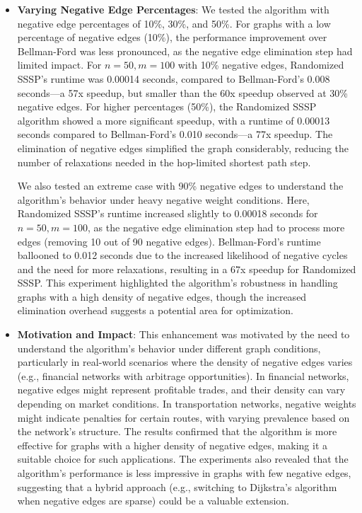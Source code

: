 \documentclass[12pt]{article}
\begin{document}
\begin{itemize}
    \item \textbf{Varying Negative Edge Percentages}: We tested the algorithm with negative edge percentages of 10\%, 30\%, and 50\%. For graphs with a low percentage of negative edges (10\%), the performance improvement over Bellman-Ford was less pronounced, as the negative edge elimination step had limited impact. For \(n=50, m=100\) with 10\% negative edges, Randomized SSSP’s runtime was 0.00014 seconds, compared to Bellman-Ford’s 0.008 seconds—a 57x speedup, but smaller than the 60x speedup observed at 30\% negative edges. For higher percentages (50\%), the Randomized SSSP algorithm showed a more significant speedup, with a runtime of 0.00013 seconds compared to Bellman-Ford’s 0.010 seconds—a 77x speedup. The elimination of negative edges simplified the graph considerably, reducing the number of relaxations needed in the hop-limited shortest path step.
    
    We also tested an extreme case with 90\% negative edges to understand the algorithm’s behavior under heavy negative weight conditions. Here, Randomized SSSP’s runtime increased slightly to 0.00018 seconds for \(n=50, m=100\), as the negative edge elimination step had to process more edges (removing 10 out of 90 negative edges). Bellman-Ford’s runtime ballooned to 0.012 seconds due to the increased likelihood of negative cycles and the need for more relaxations, resulting in a 67x speedup for Randomized SSSP. This experiment highlighted the algorithm’s robustness in handling graphs with a high density of negative edges, though the increased elimination overhead suggests a potential area for optimization.

    \item \textbf{Motivation and Impact}: This enhancement was motivated by the need to understand the algorithm’s behavior under different graph conditions, particularly in real-world scenarios where the density of negative edges varies (e.g., financial networks with arbitrage opportunities). In financial networks, negative edges might represent profitable trades, and their density can vary depending on market conditions. In transportation networks, negative weights might indicate penalties for certain routes, with varying prevalence based on the network’s structure. The results confirmed that the algorithm is more effective for graphs with a higher density of negative edges, making it a suitable choice for such applications. The experiments also revealed that the algorithm’s performance is less impressive in graphs with few negative edges, suggesting that a hybrid approach (e.g., switching to Dijkstra’s algorithm when negative edges are sparse) could be a valuable extension.
\end{itemize}
\end{document}
